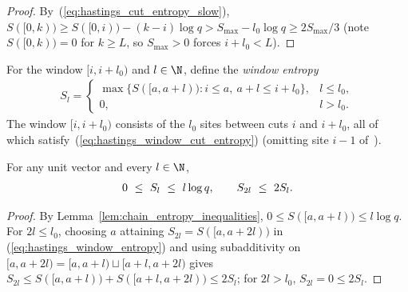 \begin{proof}
    \leanok
    By~(\ref{eq:hastings_cut_entropy_slow}),
    $S(\lbrack 0,k))\ge S(\lbrack 0,i))-(k-i)\log q>S_{\max}-l_0\log q\ge 2S_{\max}/3$
    (note $S(\lbrack 0,k))=0$ for $k\ge L$, so $S_{\max}>0$ forces $i+l_0<L$).
\end{proof}

\begin{definition}
    \label{def:hastings_window_entropy}
    \leanok
    For the window $\lbrack i,i+l_0)$ and $l\in\N$, define the \emph{window
        entropy}
    \begin{align}
        S_l=\begin{cases}
                \max\bigl\{S(\lbrack a,a+l)):i\le a,\ a+l\le i+l_0\bigr\}, & l\le l_0, \\
                0,                                                         & l>l_0.
            \end{cases}
        \label{eq:hastings_window_entropy}
    \end{align}
    The window $[i,i+l_0)$ consists of the $l_0$ sites between cuts $i$ and
    $i+l_0$, all of which satisfy~(\ref{eq:hastings_window_cut_entropy}) (omitting
    site $i-1$ of~\cite{Hastings2007AreaLaw}).
\end{definition}

\begin{lemma}
    \label{thm:hastings_window_entropy_bounds}
    \leanok
    For any unit vector and every $l\in\N$,
    \begin{align}
        0\ \le\ S_l\ \le\ l\log q,
        \qquad
        S_{2l}\ \le\ 2S_l .
        \notag
    \end{align}
\end{lemma}

\begin{proof}
    \leanok
    By Lemma~\ref{lem:chain_entropy_inequalities}, $0\le S(\lbrack a,a+l))\le l\log q$.
    For $2l\le l_0$, choosing $a$ attaining $S_{2l}=S(\lbrack a,a+2l))$ in
    (\ref{eq:hastings_window_entropy}) and using subadditivity on
    $\lbrack a,a+2l)=\lbrack a,a+l)\sqcup\lbrack a+l,a+2l)$ gives
    $S_{2l}\le S(\lbrack a,a+l))+S(\lbrack a+l,a+2l))\le 2S_l$; for $2l>l_0$,
    $S_{2l}=0\le 2S_l$.
\end{proof}

